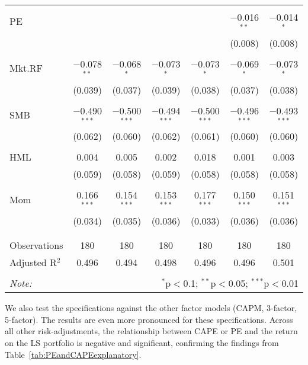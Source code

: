 \documentclass[11pt]{article}
\begin{document}
\begin{table}[!htbp]
\begin{tabular*}{\textwidth}{l @{\extracolsep{\fill}} cccccc}
		& & & & & & \\ 
		PE &  &  &  &  & $-$0.016$^{**}$ & $-$0.014$^{*}$ \\ 
		&  &  &  &  & (0.008) & (0.008) \\ 
		& & & & & & \\ 
		Mkt.RF & $-$0.078$^{**}$ & $-$0.068$^{*}$ & $-$0.073$^{*}$ & $-$0.073$^{*}$ & $-$0.069$^{*}$ & $-$0.073$^{*}$ \\ 
		& (0.039) & (0.037) & (0.039) & (0.038) & (0.037) & (0.038) \\ 
		& & & & & & \\ 
		SMB & $-$0.490$^{***}$ & $-$0.500$^{***}$ & $-$0.494$^{***}$ & $-$0.500$^{***}$ & $-$0.496$^{***}$ & $-$0.493$^{***}$ \\ 
		& (0.062) & (0.060) & (0.062) & (0.061) & (0.060) & (0.060) \\ 
		& & & & & & \\ 
		HML & 0.004 & 0.005 & 0.002 & 0.018 & 0.001 & 0.003 \\ 
		& (0.059) & (0.058) & (0.059) & (0.058) & (0.058) & (0.058) \\ 
		& & & & & & \\ 
		Mom & 0.166$^{***}$ & 0.154$^{***}$ & 0.153$^{***}$ & 0.177$^{***}$ & 0.150$^{***}$ & 0.151$^{***}$ \\ 
		& (0.034) & (0.035) & (0.036) & (0.033) & (0.036) & (0.036) \\ 
		& & & & & & \\ 
		\hline \\[-1.8ex] 
		Observations & 180 & 180 & 180 & 180 & 180 & 180 \\ 
		Adjusted R$^{2}$ & 0.496 & 0.494 & 0.498 & 0.496 & 0.496 & 0.501 \\ 
		\hline 
		\hline \\[-1.8ex] 
		\textit{Note:}  & \multicolumn{6}{r}{$^{*}$p$<$0.1; $^{**}$p$<$0.05; $^{***}$p$<$0.01} \\ 
	\end{tabular*} 
\end{table} 


We also test the specifications against the other factor models (CAPM, 3-factor, 5-factor). The results are even more pronounced for these specifications. Across all other risk-adjustments, the relationship between CAPE or PE and the return on the LS portfolio is negative and significant, confirming the findings from Table~\ref{tab:PEandCAPEexplanatory}.
\end{document}
